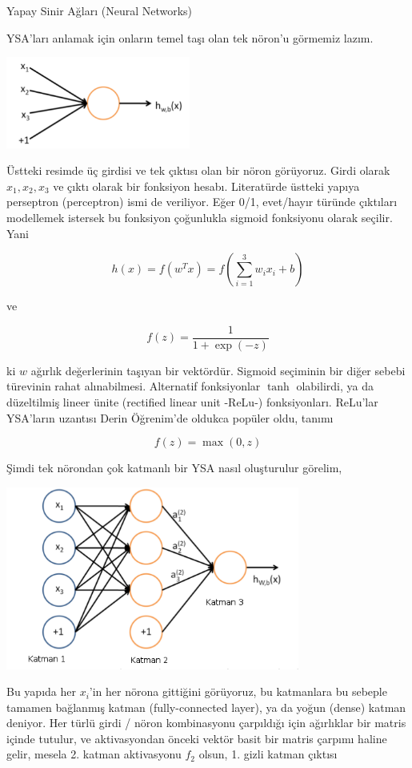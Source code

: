 \documentclass[12pt,fleqn]{article}\usepackage{../../common}
\begin{document}
Yapay Sinir Ağları (Neural Networks)

YSA'ları anlamak için onların temel taşı olan tek nöron'u görmemiz lazım. 

\includegraphics[height=3cm]{mlp_03.png}

Üstteki resimde üç girdisi ve tek çıktısı olan bir nöron görüyoruz. Girdi
olarak $x_1,x_2,x_3$ ve çıktı olarak bir fonksiyon hesabı. Literatürde
üstteki yapıya perseptron (perceptron) ismi de veriliyor. Eğer 0/1,
evet/hayır türünde çıktıları modellemek istersek bu fonksiyon çoğunlukla
sigmoid fonksiyonu olarak seçilir. Yani

$$ h (x) = f(w^Tx) = f(\sum_{i=1}^{3} w_ix_i + b)$$

ve 

$$ f(z) = \frac{1}{1 + \exp(-z)}$$

ki $w$ ağırlık değerlerinin taşıyan bir vektördür. Sigmoid seçiminin bir
diğer sebebi türevinin rahat alınabilmesi. Alternatif fonksiyonlar $\tanh$
olabilirdi, ya da düzeltilmiş lineer ünite (rectified linear unit -ReLu-)
fonksiyonları. ReLu'lar YSA'ların uzantısı Derin Öğrenim'de oldukca popüler
oldu, tanımı

$$ f(z) = \max(0,z)$$

Şimdi tek nörondan çok katmanlı bir YSA nasıl oluşturulur görelim, 

\includegraphics[height=6cm]{mlp_04.png}

Bu yapıda her $x_i$'in her nörona gittiğini görüyoruz, bu katmanlara bu
sebeple tamamen bağlanmış katman (fully-connected layer), ya da yoğun
(dense) katman deniyor. Her türlü girdi / nöron kombinasyonu çarpıldığı
için ağırlıklar bir matris içinde tutulur, ve aktivasyondan önceki vektör
basit bir matris çarpımı haline gelir, mesela 2. katman aktivasyonu $f_2$
olsun, 1. gizli katman çıktısı
\end{document}
